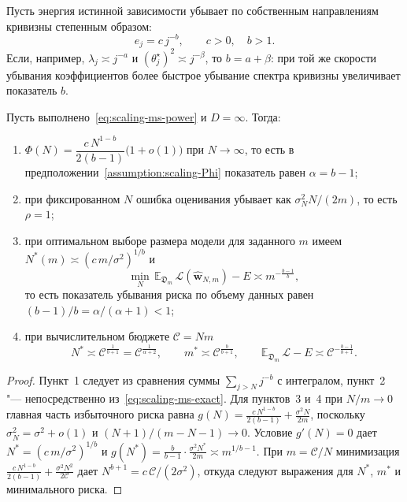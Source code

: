 Пусть энергия истинной зависимости убывает по собственным направлениям кривизны степенным образом:
\begin{equation}
    \label{eq:scaling-ms-power}
    e_j = c\, j^{-b}, \qquad c > 0, \quad b > 1.
\end{equation}
Если, например, $\lambda_j \asymp j^{-a}$ и $(\theta_j^\star)^2 \asymp j^{-\beta}$, то $b = a + \beta$: при той же скорости убывания коэффициентов более быстрое убывание спектра кривизны увеличивает показатель $b$.

\begin{corollary}
    \label{cor:scaling-ms-exponents}
    Пусть выполнено~\eqref{eq:scaling-ms-power} и $D = \infty$. Тогда:
    \begin{enumerate}
        \item $\Phi(N) = \dfrac{c\,N^{1-b}}{2(b-1)}\big(1 + o(1)\big)$ при $N \to \infty$, то есть в предположении~\ref{assumption:scaling-Phi} показатель равен $\alpha = b - 1$;
        \item при фиксированном $N$ ошибка оценивания убывает как $\sigma_N^2 N/(2m)$, то есть $\rho = 1$;
        \item при оптимальном выборе размера модели для заданного $m$ имеем $N^*(m) \asymp (c\,m/\sigma^2)^{1/b}$ и
        \[
            \min_{N}\, \mathbb E_{\mathfrak D_m}\,\mathcal L(\hat{\mathbf w}_{N, m}) - E \asymp m^{-\frac{b-1}{b}},
        \]
        то есть показатель убывания риска по объему данных равен $(b-1)/b = \alpha/(\alpha+1) < 1$;
        \item при вычислительном бюджете $\mathcal C = N m$
        \[
            N^* \asymp \mathcal C^{\frac{1}{b+1}} = \mathcal C^{\frac{1}{\alpha+2}},
            \qquad
            m^* \asymp \mathcal C^{\frac{b}{b+1}},
            \qquad
            \mathbb E_{\mathfrak D_m}\,\mathcal L - E \asymp \mathcal C^{-\frac{b-1}{b+1}}.
        \]
    \end{enumerate}
\end{corollary}

\begin{proof}
    Пункт~1 следует из сравнения суммы $\sum_{j>N} j^{-b}$ с интегралом, пункт~2 "--- непосредственно из~\eqref{eq:scaling-ms-exact}. Для пунктов~3 и~4 при $N/m \to 0$ главная часть избыточного риска равна $g(N) = \frac{c\,N^{1-b}}{2(b-1)} + \frac{\sigma^2 N}{2m}$, поскольку $\sigma_N^2 = \sigma^2 + o(1)$ и $(N+1)/(m-N-1) \to 0$. Условие $g'(N) = 0$ дает $N^* = (c\,m/\sigma^2)^{1/b}$ и $g(N^*) = \frac{b}{b-1}\cdot\frac{\sigma^2 N^*}{2m} \asymp m^{1/b - 1}$. При $m = \mathcal C/N$ минимизация $\frac{c\,N^{1-b}}{2(b-1)} + \frac{\sigma^2 N^2}{2\mathcal C}$ дает $N^{b+1} = c\,\mathcal C/(2\sigma^2)$, откуда следуют выражения для $N^*$, $m^*$ и минимального риска.
\end{proof}

